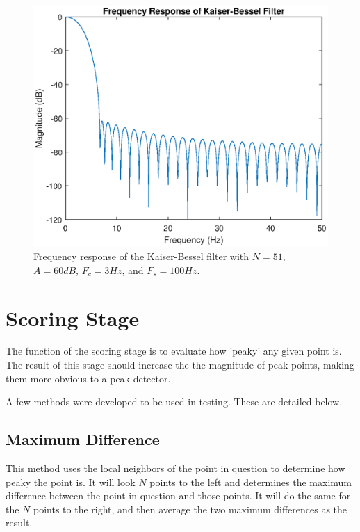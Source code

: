                 \begin{figure}[!th]
                    \includegraphics[width=\textwidth]{Images/kb_filter.eps}
                    \centering
                    \caption{Frequency response of the Kaiser-Bessel filter with $N=51$, $A=60dB$, $F_c = 3Hz$, and $F_s= 100Hz$.}
                    \label{img_kb_filter}
                \end{figure}  

        \section{Scoring Stage}

            The function of the scoring stage is to evaluate how 'peaky' any given point is. The result of this stage should increase the the magnitude of peak points, making them more obvious to a peak detector.

            A few methods were developed to be used in testing. These are detailed below.

            \subsection{Maximum Difference}

                This method uses the local neighbors of the point in question to determine how peaky the point is. It will look $N$ points to the left and determines the maximum difference between the point in question and those points. It will do the same for the $N$ points to the right, and then average the two maximum differences as the result.


